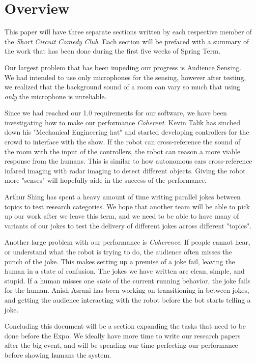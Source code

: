 \documentclass[onecolumn, draftclsnofoot,10pt, compsoc]{IEEEtran}
\begin{document}
\section{Overview}
	This paper will have three separate sections written by each respective member of the \textit{Short Circuit Comedy Club}. 
Each section will be prefaced with a summary of the work that has been done during the first five weeks of Spring Term.


Our largest problem that has been impeding our progress is Audience Sensing. 
We had intended to use only microphones for the sensing, however after testing, we realized that the background sound of a room can vary so much that using \textit{only} the microphone is unreliable.

Since we had reached our 1.0 requirements for our software, we have been investigating how to make our performance \textit{Coherent}. Kevin Talik has sinched down his "Mechanical Engineering hat" and started developing controllers for the crowd to interface with the show. If the robot can cross-reference the sound of the room with the input of the controllers, the robot can reason a more viable response from the humans. This is similar to how autonomous cars cross-reference infared imaging with radar imaging to detect different objects. Giving the robot more "senses" will hopefully aide in the success of the performance.

Arthur Shing has spent a heavy amount of time writing parallel jokes between topics to test research categories. We hope that another team will be able to pick up our work after we leave this term, and we need to be able to have many of variants of our jokes to test the delivery of different jokes across different "topics".

Another large problem with our performance is \textit{Coherence}. If people cannot hear, or understand what the robot is trying to do, the audience often misses the punch of the joke.
This makes setting up a premise of a joke fail, leaving the human in a state of confusion. The jokes we have written are clean, simple, and stupid. If a human misses one \textit{state} of the current running behavior, the joke fails for the human.
Anish Asrani has been working on transitioning in between jokes, and getting the audience interacting with the robot before the bot starts telling a joke.

Concluding this document will be a section expanding the tasks that need to be done before the Expo. We ideally have more time to write our research papers after the big event, and will be spending our time perfecting our performance before showing humans the system.
\end{document}
